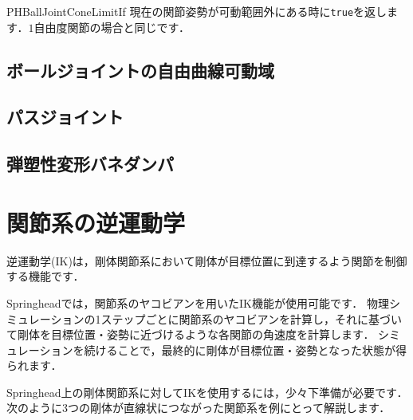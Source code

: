 \begin{reference}{PHBallJointConeLimitIf}
\KLUDGE 現在の関節姿勢が可動範囲外にある時に\texttt{true}\KLUDGE を返します．$1$\KLUDGE 自由度関節の場合と同じです．
\end{reference}



\subsection*{\KLUDGE ボールジョイントの自由曲線可動域} \label{sec_splinelimit}





\subsection*{\KLUDGE パスジョイント} \label{sec_phpathjoint}



\subsection*{\KLUDGE 弾塑性変形バネダンパ}







\section{\KLUDGE 関節系の逆運動学}

%
% 

\KLUDGE 逆運動学(IK)\KLUDGE は，剛体関節系において剛体が目標位置に到達するよう関節を制御する機能です．

Springhead\KLUDGE では，関節系のヤコビアンを用いたIK\KLUDGE 機能が使用可能です．
\KLUDGE 物理シミュレーションの1\KLUDGE ステップごとに関節系のヤコビアンを計算し，それに基づいて剛体を目標位置・姿勢に近づけるような各関節の角速度を計算します．
\KLUDGE シミュレーションを続けることで，最終的に剛体が目標位置・姿勢となった状態が得られます．

Springhead\KLUDGE 上の剛体関節系に対してIK\KLUDGE を使用するには，少々下準備が必要です．
\KLUDGE 次のように3\KLUDGE つの剛体が直線状につながった関節系を例にとって解説します．

